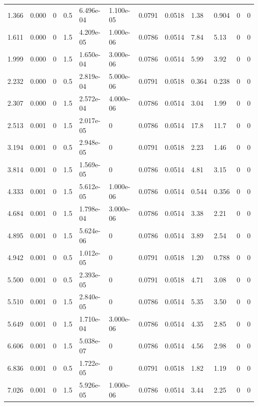 \documentclass[preview]{standalone}
\begin{document}
{{\begin{tabular}{L{1.2cm}C{1.2cm} C{0.3cm}C{0.5cm} C{1.4cm}C{1.4cm} C{1.4cm}C{1.4cm} C{1.6cm}C{1.6cm} C{1.6cm}C{1.6cm}}
  1.366  &  0.000  & 0     & 0.5 &  6.496e-04  & 1.100e-05  &  0.0791&   0.0518& 1.38 & 0.904   &  0 & 0  \\ 
  1.611  &  0.000  & 0     & 1.5 &  4.209e-05  & 1.000e-06  &  0.0786&   0.0514& 7.84 & 5.13   &  0 & 0  \\ 
  1.999  &  0.000  & 0     & 1.5 &  1.650e-04  & 3.000e-06  &  0.0786&   0.0514& 5.99 & 3.92   &  0 & 0  \\ 
  2.232  &  0.000  & 0     & 0.5 &  2.819e-04  & 5.000e-06  &  0.0791&   0.0518& 0.364 & 0.238   &  0 & 0  \\ 
  2.307  &  0.000  & 0     & 1.5 &  2.572e-04  & 4.000e-06  &  0.0786&   0.0514& 3.04 & 1.99   &  0 & 0  \\ 
  2.513  &  0.001  & 0     & 1.5 &  2.017e-05  & 0  &  0.0786&   0.0514& 17.8 & 11.7   &  0 & 0  \\ 
  3.194  &  0.001  & 0     & 0.5 &  2.948e-05  & 0  &  0.0791&   0.0518& 2.23 & 1.46   &  0 & 0  \\ 
  3.814  &  0.001  & 0     & 1.5 &  1.569e-05  & 0  &  0.0786&   0.0514& 4.81 & 3.15   &  0 & 0  \\ 
  4.333  &  0.001  & 0     & 1.5 &  5.612e-05  & 1.000e-06  &  0.0786&   0.0514& 0.544 & 0.356   &  0 & 0  \\ 
  4.684  &  0.001  & 0     & 1.5 &  1.798e-04  & 3.000e-06  &  0.0786&   0.0514& 3.38 & 2.21   &  0 & 0  \\ 
  4.895  &  0.001  & 0     & 1.5 &  5.624e-06  & 0  &  0.0786&   0.0514& 3.89 & 2.54   &  0 & 0  \\ 
  4.942  &  0.001  & 0     & 0.5 &  1.012e-05  & 0  &  0.0791&   0.0518& 1.20 & 0.788   &  0 & 0  \\ 
  5.500  &  0.001  & 0     & 0.5 &  2.393e-05  & 0  &  0.0791&   0.0518& 4.71 & 3.08   &  0 & 0  \\ 
  5.510  &  0.001  & 0     & 1.5 &  2.840e-05  & 0  &  0.0786&   0.0514& 5.35 & 3.50   &  0 & 0  \\ 
  5.649  &  0.001  & 0     & 1.5 &  1.710e-04  & 3.000e-06  &  0.0786&   0.0514& 4.35 & 2.85   &  0 & 0  \\ 
  6.606  &  0.001  & 0     & 1.5 &  5.038e-07  & 0  &  0.0786&   0.0514& 4.56 & 2.98   &  0 & 0  \\ 
  6.836  &  0.001  & 0     & 0.5 &  1.722e-05  & 0  &  0.0791&   0.0518& 1.82 & 1.19   &  0 & 0  \\ 
  7.026  &  0.001  & 0     & 1.5 &  5.926e-05  & 1.000e-06  &  0.0786&   0.0514& 3.44 & 2.25   &  0 & 0  \\ 

\end{tabular}}}
\end{document}
